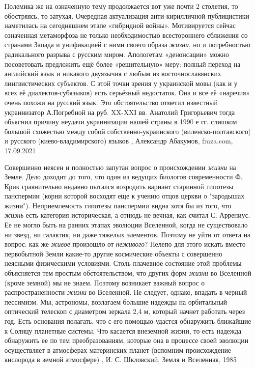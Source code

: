 Полемика же на означенную тему продолжается вот уже почти 2 столетия, то
обостряясь, то затухая. Очередная актуализация анти-кирилличной публицистики
наметилась на сегодняшнем этапе «гибридной войны». Мотивируется сейчас
означенная метаморфоза не только необходимостью всестороннего сближения со
странами Запада и унификацией с ними своего образа \emph{жизни}, но и
потребностью радикального разрыва с русским миром. Апологетам «денонсации»
можно посоветовать предложить ещё более «решительную» меру: полный переход на
английский язык и никакого двуязычия с любым из восточнославянских
лингвистических субъектов.  С этой точки зрения у украинской мовы (как и у всех
её диалектов-субязыков) есть серьёзный недостаток. Она и все её «наречия» очень
похожи на русский язык.  Это обстоятельство отметил известный украинизатор
А.Погребной на руб. XX-XXI вв. Анатолий Григорьевич тогда обьяснил причину
неудачи украинизации нашей страны в 1990 е гг. слишком большой схожестью между
собой собственно-украинского (виленско-полтавского) и русского
(киево-владимирского) языков
, 
Александр Абакумов, fraza.com, 17.09.2021

Совершенно неясен и полностью запутан вопрос о происхождении \emph{жизни} на
Земле. Дело доходит до того, что один из ведущих биологов современности Ф.
Крик сравнительно недавно пытался возродить вариант старинной гипотезы
панспермии (корни которой восходят еще к учению отцов церкви о "зародышах
жизни").  Неприемлемость гипотезы панспермии видна хотя бы из того, что
\emph{жизнь} есть категория историческая, а отнюдь не вечная, как считал С.
Аррениус. Ее не могло быть на ранних этапах эволюции Вселенной, когда не
существовало ни звезд, ни галактик, ни даже тяжелых элементов. Поэтому не уйти
от ответа на вопрос: как же \emph{живое} произошло от \emph{неживого}? Нелепо
для этого искать вместо первобытной Земли какие-то другие космические объекты с
совершенно неясными физическими условиями.  Столь плачевное состояние этой
проблемы объясняется тем простым обстоятельством, что других форм \emph{жизни}
во Вселенной (кроме земной) мы не знаем.  Поэтому возникает важный вопрос о
распространенности \emph{жизни} во Вселенной. Не следует, однако, впадать в
черный пессимизм. Мы, астрономы, возлагаем большие надежды на орбитальный
оптический телескоп с диаметром зеркала 2,4 м, который начнет работать через
год. Есть основания полагать. что с его помощью удастся обнаружить ближайшие к
Солнцу планетные системы. Что касается внеземной жизни, то есть надежда
обнаружить ее по тем преобразованиям, которые она в процессе своей эволюции
осуществляет в атмосферах материнских планет (вспомним происхождение кислорода
в земной атмосфере)
, И. С. Шкловский, Земля и Вселенная, 1985

